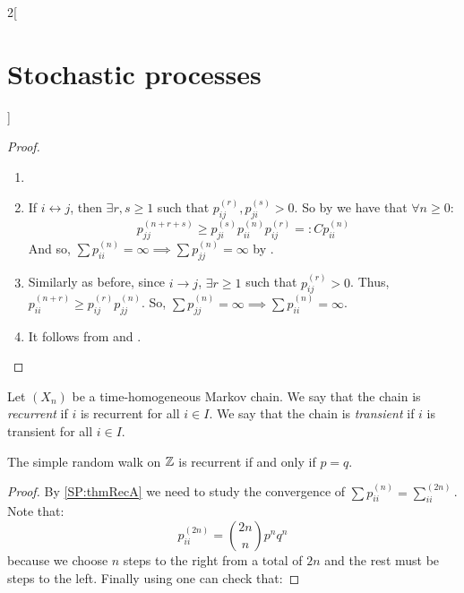 \documentclass[../../../main_math.tex]{subfiles}
\begin{document}
\begin{multicols}{2}[\section{Stochastic processes}]
\begin{theorem}
\begin{enumerate}
    \end{enumerate}
  \end{theorem}
  \begin{proof}
    \begin{enumerate}
      \item {}
      \item If $i\leftrightarrow j$, then $\exists r,s\geq 1$ such that $p_{ij}^{(r)}, p_{ji}^{(s)}>0$. So by  we have that $\forall n\geq 0$:
            $$
              p_{jj}^{(n+r+s)} \geq p_{ji}^{(s)}p_{ii}^{(n)}p_{ij}^{(r)}=:C p_{ii}^{(n)}
            $$
            And so, $\sum p_{ii}^{(n)}=\infty\implies \sum p_{jj}^{(n)} = \infty$ by .
      \item Similarly as before, since $i\to j$, $\exists r\geq 1$ such that $p_{ij}^{(r)}>0$. Thus, $p_{ii}^{(n+r)}\geq p_{ij}^{(r)}p_{jj}^{(n)}$. So, $\sum p_{jj}^{(n)}=\infty\implies \sum p_{ii}^{(n)} = \infty$.
      \item It follows from  and .
    \end{enumerate}
  \end{proof}
  \begin{definition}
    Let $(X_n)$ be a time-homogeneous Markov chain. We say that the chain is \emph{recurrent} if $i$ is recurrent for all $i\in I$. We say that the chain is \emph{transient} if $i$ is transient for all $i\in I$.
  \end{definition}
  \begin{theorem}
    The simple random walk on $\mathbb{Z}$ is recurrent if and only if $p=q$.
  \end{theorem}
  \begin{proof}
    By \cref{SP:thmRecA} we need to study the convergence of $\sum p_{ii}^{(n)}=\sum_{ii}^{(2n)}$. Note that:
    \begin{equation*}
      p_{ii}^{(2n)}=\binom{2n}{n}p^nq^n
    \end{equation*}
    because we choose $n$ steps to the right from a total of $2n$ and the rest must be steps to the left. Finally using  one can check that:

\end{proof}
\end{multicols}
\end{document}

